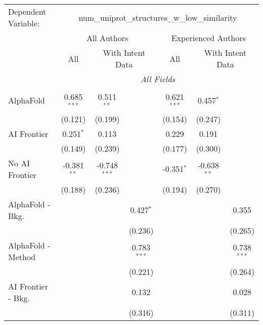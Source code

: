 \begingroup
\centering
\begin{tabular}{lcccccc}
   \tabularnewline \midrule \midrule
   Dependent Variable: & \multicolumn{6}{c}{num\_uniprot\_structures\_w\_low\_similarity}\\
 & \multicolumn{3}{c}{All Authors} & \multicolumn{3}{c}{Experienced Authors} \\
\cmidrule(lr){2-4} \cmidrule(lr){5-7}
 & \multicolumn{1}{c}{All} & \multicolumn{2}{c}{With Intent Data} & \multicolumn{1}{c}{All} & \multicolumn{2}{c}{With Intent Data} \\
\cmidrule(lr){2-2} \cmidrule(lr){3-4} \cmidrule(lr){5-5} \cmidrule(lr){6-7}
 & \multicolumn{6}{c}{\textit{All Fields}} \\ \\
   AlphaFold               & 0.685$^{***}$ & 0.511$^{**}$   &               & 0.621$^{***}$ & 0.457$^{*}$   &   \\   
                           & (0.121)       & (0.199)        &               & (0.154)       & (0.247)       &   \\   
   AI Frontier             & 0.251$^{*}$   & 0.113          &               & 0.229         & 0.191         &   \\   
                           & (0.149)       & (0.239)        &               & (0.177)       & (0.300)       &   \\   
   No AI Frontier          & -0.381$^{**}$ & -0.748$^{***}$ &               & -0.351$^{*}$  & -0.638$^{**}$ &   \\   
                           & (0.188)       & (0.236)        &               & (0.194)       & (0.270)       &   \\   
   AlphaFold - Bkg.        &               &                & 0.427$^{*}$   &               &               & 0.355\\   
                           &               &                & (0.236)       &               &               & (0.265)\\   
   AlphaFold - Method      &               &                & 0.783$^{***}$ &               &               & 0.738$^{***}$\\   
                           &               &                & (0.221)       &               &               & (0.264)\\   
   AI Frontier - Bkg.      &               &                & 0.132         &               &               & 0.028\\   
                           &               &                & (0.316)       &               &               & (0.311)\\   

\end{tabular}

